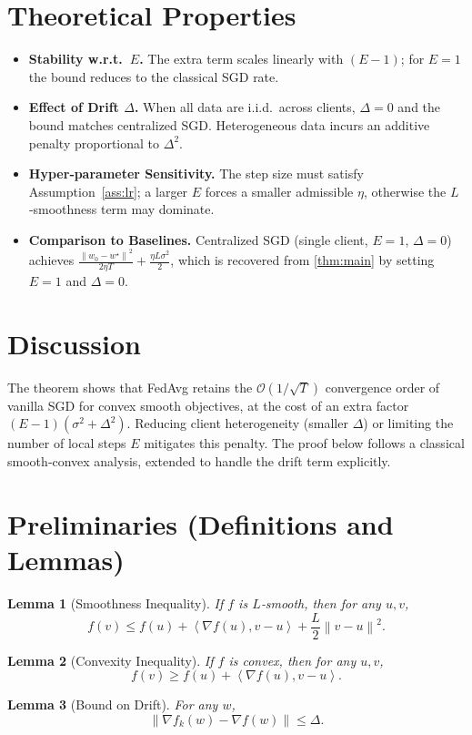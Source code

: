 \documentclass[11pt]{article}
\newtheorem{lemma}{Lemma}
\newcommand{\norm}[1]{\left\lVert#1\right\rVert}
\newcommand{\inner}[2]{\left\langle #1,#2\right\rangle}
\begin{document}
\section*{Theoretical Properties}
\begin{itemize}
\item \textbf{Stability w.r.t.\ $E$.} The extra term scales linearly with $(E-1)$; for $E=1$ the bound reduces to the classical SGD rate.
\item \textbf{Effect of Drift $\Delta$.} When all data are i.i.d.\ across clients, $\Delta=0$ and the bound matches centralized SGD. Heterogeneous data incurs an additive penalty proportional to $\Delta^2$.
\item \textbf{Hyper‑parameter Sensitivity.} The step size must satisfy Assumption~\ref{ass:lr}; a larger $E$ forces a smaller admissible $\eta$, otherwise the $L$‑smoothness term may dominate.
\item \textbf{Comparison to Baselines.} Centralized SGD (single client, $E=1$, $\Delta=0$) achieves $\frac{\norm{w_0-w^\star}^2}{2\eta T}+ \frac{\eta L\sigma^2}{2}$, which is recovered from \eqref{thm:main} by setting $E=1$ and $\Delta=0$.
\end{itemize}

\section*{Discussion}
The theorem shows that FedAvg retains the $\mathcal{O}(1/\sqrt{T})$ convergence order of vanilla SGD for convex smooth objectives, at the cost of an extra factor $(E-1)(\sigma^2+\Delta^2)$. Reducing client heterogeneity (smaller $\Delta$) or limiting the number of local steps $E$ mitigates this penalty. The proof below follows a classical smooth‑convex analysis, extended to handle the drift term explicitly.

\newpage

\section*{Preliminaries (Definitions and Lemmas)}
\begin{lemma}[Smoothness Inequality]\label{lem:smooth}
If $f$ is $L$‑smooth, then for any $u,v$,
\[
f(v)\le f(u)+\inner{\nabla f(u)}{v-u}
+\frac{L}{2}\norm{v-u}^2 .
\]
\end{lemma}
\begin{lemma}[Convexity Inequality]\label{lem:convex}
If $f$ is convex, then for any $u,v$,
\[
f(v)\ge f(u)+\inner{\nabla f(u)}{v-u}.
\]
\end{lemma}
\begin{lemma}[Bound on Drift]\label{lem:drift}
For any $w$,
\[
\norm{\nabla f_k(w)-\nabla f(w)}\le\Delta .
\]
\end{lemma}
\end{document}

